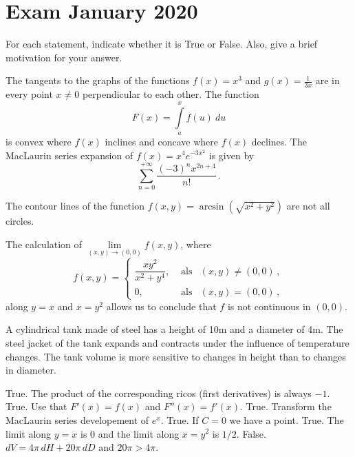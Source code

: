 \section{Exam January 2020}
\begin{Exercise} For each statement, indicate whether it is True or False. Also, give a brief motivation for your answer. 

\Question The tangents to the graphs of the functions $f(x)=x^3$ and $g(x)=\frac{1}{3x}$ are in every point $x \neq 0$ perpendicular to each other.
\Question  The function
	$$
	F(x)=\displaystyle\int\limits_a^xf(u)\ du
	$$
	is convex  where $f(x)$ inclines and concave where $f(x)$ declines. 
\Question  The MacLaurin series expansion of $f(x)=x^4e^{-3x^2}$ is given by
$$
\sum\limits_{n = 0}^{+\infty} {\frac{{{{\left( { - 3} \right)}^n}{x^{2n + 4}}}}{{n!}}}\,.$$
	
\Question The contour lines of the function $f(x,y)=\arcsin\left(\sqrt{x^2+y^2}\right)$ are not all circles. 

\Question  The calculation of $\lim\limits_{(x,y)\to(0,0)} f(x,y)$, where
	$$
	f(x,y)=\left\{\begin{array}{rcl}
	\dfrac{xy^2}{x^2+y^4},& \text{ als} &(x,y)\neq(0,0)\,,\\[0.2cm]
	0,& \text{ als}&(x,y)=(0,0)\,,
	\end{array}\right.
	$$
	along $y=x$ and $x=y^2$ allows us to conclude that $f$ is not continuous in $(0,0)$. 
	
\Question A cylindrical tank made of steel has a height of 10m and a diameter of 4m. The steel jacket of the tank expands and contracts under the influence of temperature changes. The tank volume is more sensitive to changes in height than to changes in diameter. 
\end{Exercise}


\begin{Answer}
\Question True. The product of the corresponding ricos (first derivatives) is always $-1$.
\Question True. Use that $F'(x)=f(x)$ and $F''(x)=f'(x)$.
\Question True. Transform the MacLaurin series developement of $e^x$.
\Question True. If $C=0$ we have a point.
\Question True. The limit along $y=x$ is 0 and the limit along $x=y^2$ is $1/2$.
\Question False. $dV = 4\pi\, dH + 20\pi\, dD$ and $20\pi>4\pi$.
 
\end{Answer}


